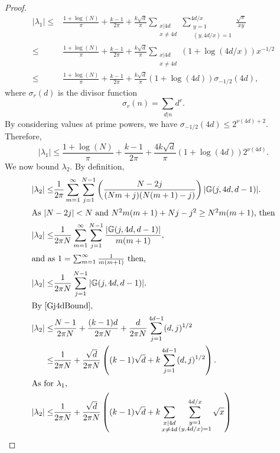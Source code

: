 \documentclass[12pt, a4paper]{article}
\newcommand{\GG}{\mathbb{G}}
\newcommand{\opn}{\operatorname}
\begin{document}
\begin{proof}
    \begin{align*}
      \vert \lambda_1 \vert \leq &
      \frac{1 + \opn{log}(N)}{\pi}
      + \frac{k-1}{2 \pi}
      + \frac{k \sqrt{d}}{\pi}
      \sum_{\substack{x \vert 4d \\ x \neq 4d}}
      \sum_{\substack{y = 1 \\ (y, 4d/x) = 1}}^{4d/x}
      \frac{\sqrt{x}}{xy} \\
      \leq &
      \frac{1 + \opn{log}(N)}{\pi}
      + \frac{k-1}{2 \pi}
      + \frac{k \sqrt{d}}{\pi}
      \sum_{\substack{x \vert 4d \\ x \neq 4d}} ( 1 + \opn{log}(4d/x) ) x^{-1/2} 
       \\
      \leq &
      \frac{1 + \opn{log}(N)}{\pi}
      + \frac{k-1}{2 \pi}
      + \frac{k \sqrt{d}}{\pi} ( 1 + \opn{log}(4d)) \sigma_{-1/2}(4d),  
    \end{align*}
    where $\sigma_r(d)$ is the divisor function
    \[
    \sigma_r(n) = \sum_{d \vert n} d^r.
    \]
By considering values at prime powers, we have $\sigma_{-1/2}(4d) \leq 2^{\nu(4d) + 2}$.
    Therefore,
    \[
    \vert \lambda_1 \vert
    \leq
    \frac{1 + \opn{log}(N)}{\pi}
    + \frac{k-1}{2 \pi}
    + \frac{4k \sqrt{d}}{\pi } (1 + \opn{log}(4d)) 2^{\nu(4d)}.
    \]
    We now bound $\lambda_2$.
    By definition,
    \begin{align*}
      \vert \lambda_2 \vert
      \leq &
      \frac{1}{2 \pi} \sum_{m=1}^{\infty} \sum_{j=1}^{N-1}
      \left ( \frac{N-2j}{(Nm+j)(N(m+1) - j)} \right )
      \vert \GG(j, 4d, d-1) \vert. \\
      \intertext{As $\vert N-2j \vert < N$ and $N^2m(m+1) + Nj - j^2 \geq N^2m(m+1)$, then}
      \vert \lambda_2 \vert \leq &
      \frac{1}{2 \pi N} \sum_{m=1}^{\infty} \sum_{j=1}^{N-1} \frac{\vert \GG(j, 4d, d-1) \vert }{m(m+1)}, \\
      \intertext{and as $1 = \sum_{m=1}^{\infty} \frac{1}{m(m+1)}$ then,}
      \vert \lambda_2 \vert
      \leq &
      \frac{1}{2 \pi N} \sum_{j=1}^{N-1} \vert \GG(j , 4d, d-1) \vert. \\
      \intertext{By \eqref{Gj4dBound},}
      \vert \lambda_2 \vert \leq &
      \frac{N-1}{2 \pi N} + \frac{(k-1)d}{2 \pi N}
      + \frac{d}{2 \pi N} \sum_{j=1}^{4d-1} (d,j)^{1/2} \\
      \leq & \frac{1}{2 \pi N} + \frac{\sqrt{d}}{2 \pi N} \left ( (k-1) \sqrt{d} + k \sum_{j=1}^{4d-1}(d,j)^{1/2} \right ). \\
      \intertext{As for $\lambda_1$, }
      \vert \lambda_2 \vert
      \leq & \frac{1}{2 \pi N} + \frac{\sqrt{d}}{2 \pi N} \left ( (k-1)\sqrt{d} + k \sum_{\substack{x \vert 4d \\ x \neq 4d}} \sum_{\substack{y = 1 \\ (y,4d/x) = 1}}^{4d/x} \sqrt{x} \right ) \\

\end{align*}
\end{proof}
\end{document}
